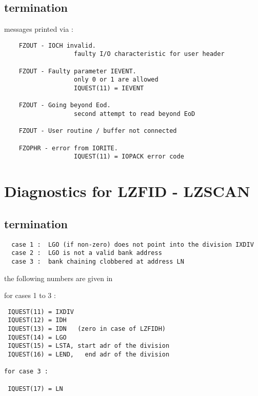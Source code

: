 \subsection*{ termination}

messages printed via :

\begin{verbatim}
    FZOUT - IOCH invalid.
                   faulty I/O characteristic for user header

    FZOUT - Faulty parameter IEVENT.
                   only 0 or 1 are allowed
                   IQUEST(11) = IEVENT

    FZOUT - Going beyond Eod.
                   second attempt to read beyond EoD

    FZOUT - User routine / buffer not connected

    FZOPHR - error from IORITE.
                   IQUEST(11) = IOPACK error code
\end{verbatim}

\section{Diagnostics for LZFID - LZSCAN}

\begin{flushleft}
\\
\\
\Sfuncz{LNEXT}{{LNEXT = LZSCAN (IXDIV,LGO)}
\end{flushleft}

\subsection*{ termination}

\begin{verbatim}
  case 1 :  LGO (if non-zero) does not point into the division IXDIV
  case 2 :  LGO is not a valid bank address
  case 3 :  bank chaining clobbered at address LN
\end{verbatim}

the following numbers are given in 

for cases 1 to 3 :

\begin{verbatim}
 IQUEST(11) = IXDIV
 IQUEST(12) = IDH
 IQUEST(13) = IDN   (zero in case of LZFIDH)
 IQUEST(14) = LGO
 IQUEST(15) = LSTA, start adr of the division
 IQUEST(16) = LEND,   end adr of the division

for case 3 :

 IQUEST(17) = LN
\end{verbatim}

